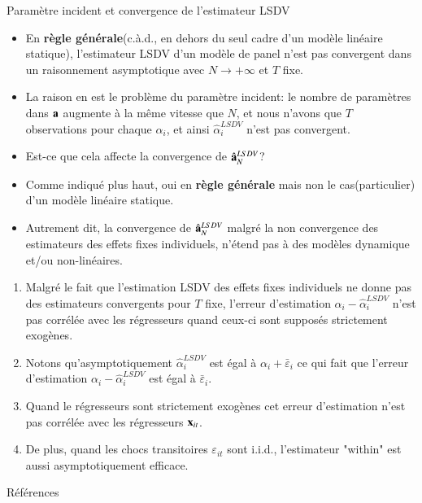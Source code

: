     \begin{frame}[allowframebreaks]{Paramètre incident et convergence de l'estimateur LSDV}
        \begin{itemize}
            \item En \textbf{règle générale}(c.à.d., en dehors du seul cadre d'un modèle linéaire statique), l'estimateur LSDV d'un modèle 
            de panel n'est pas convergent dans un raisonnement asymptotique avec $N\to + \infty$ et $T$ fixe.
            
            \item La raison en est le problème du paramètre incident: le nombre de paramètres dans ${\mathbf a}$ augmente à la même vitesse que 
            $N$, et nous n'avons que $T$ observations pour chaque $\alpha_i$, et ainsi $\hat{\alpha}^{LSDV}_i$ n'est pas convergent. 

            \item Est-ce que cela affecte la convergence de $\hat{{\mathbf a}}_N^{LSDV}$? 
            \item Comme indiqué plus haut, oui en \textbf{règle générale} mais non le cas(particulier) d'un modèle linéaire statique.
            \item Autrement dit, la convergence de $\hat{{\mathbf a}}_N^{LSDV}$ malgré la non convergence des estimateurs des effets fixes individuels, 
            n'étend pas à des modèles dynamique et/ou non-linéaires.
        \end{itemize}
        \framebreak

        \begin{remark_fr}
            \begin{enumerate}[$\star$]
                \item Malgré le fait que l'estimation LSDV des effets fixes individuels ne donne pas des estimateurs convergents 
                pour $T$ fixe, l'erreur d'estimation $\alpha_i - \hat{\alpha}_i^{LSDV}$ n'est pas corrélée avec les régresseurs 
                quand ceux-ci sont supposés strictement exogènes.  
                \item Notons qu'asymptotiquement $\hat{\alpha}_i^{LSDV}$ est égal à $\alpha_i + \bar{\varepsilon}_i$ ce qui 
                fait que l'erreur d'estimation $\alpha_i - \hat{\alpha}_i^{LSDV}$ est égal à $\bar{\varepsilon}_i$. 
                \item Quand le régresseurs sont strictement exogènes cet erreur d'estimation n'est 
                pas corrélée avec les régresseurs ${\mathbf x}_{it}$.
                \item De plus, quand les chocs transitoires $\varepsilon_{it}$ sont i.i.d., l'estimateur "within" 
                est aussi asymptotiquement efficace.
            \end{enumerate}
        \end{remark_fr}
    \end{frame}


\begin{frame}[allowframebreaks]{Références}
 
  
   \end{frame}

    
    
